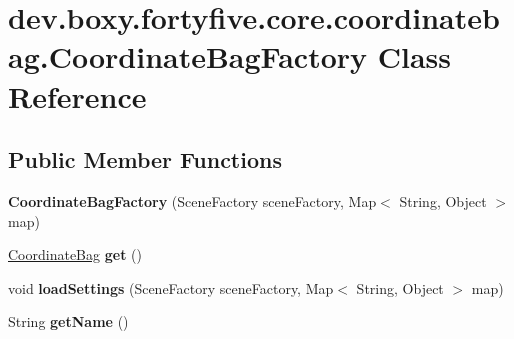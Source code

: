 \hypertarget{classdev_1_1boxy_1_1fortyfive_1_1core_1_1coordinatebag_1_1_coordinate_bag_factory}{
\section{dev.boxy.fortyfive.core.coordinatebag.CoordinateBagFactory Class Reference}
\label{dc/d0d/classdev_1_1boxy_1_1fortyfive_1_1core_1_1coordinatebag_1_1_coordinate_bag_factory}
}
\subsection*{Public Member Functions}
\begin{DoxyCompactItemize}
\item 
\hypertarget{classdev_1_1boxy_1_1fortyfive_1_1core_1_1coordinatebag_1_1_coordinate_bag_factory_a53e8addee1e4837bd815c410609d06be}{
{\bfseries CoordinateBagFactory} (SceneFactory sceneFactory, Map$<$ String, Object $>$ map)}
\label{dc/d0d/classdev_1_1boxy_1_1fortyfive_1_1core_1_1coordinatebag_1_1_coordinate_bag_factory_a53e8addee1e4837bd815c410609d06be}

\item 
\hypertarget{classdev_1_1boxy_1_1fortyfive_1_1core_1_1coordinatebag_1_1_coordinate_bag_factory_a0fdc11a210dc8d6c4e7a840f204591a5}{
\hyperlink{interfacedev_1_1boxy_1_1fortyfive_1_1core_1_1coordinatebag_1_1_coordinate_bag}{CoordinateBag} {\bfseries get} ()}
\label{dc/d0d/classdev_1_1boxy_1_1fortyfive_1_1core_1_1coordinatebag_1_1_coordinate_bag_factory_a0fdc11a210dc8d6c4e7a840f204591a5}

\item 
\hypertarget{classdev_1_1boxy_1_1fortyfive_1_1core_1_1coordinatebag_1_1_coordinate_bag_factory_abe35096feb1eb3a69e4dda89cce63c01}{
void {\bfseries loadSettings} (SceneFactory sceneFactory, Map$<$ String, Object $>$ map)}
\label{dc/d0d/classdev_1_1boxy_1_1fortyfive_1_1core_1_1coordinatebag_1_1_coordinate_bag_factory_abe35096feb1eb3a69e4dda89cce63c01}

\item 
\hypertarget{classdev_1_1boxy_1_1fortyfive_1_1core_1_1coordinatebag_1_1_coordinate_bag_factory_a50c375ac7a45553413883f84d5853206}{
String {\bfseries getName} ()}
\label{dc/d0d/classdev_1_1boxy_1_1fortyfive_1_1core_1_1coordinatebag_1_1_coordinate_bag_factory_a50c375ac7a45553413883f84d5853206}

\end{DoxyCompactItemize}
